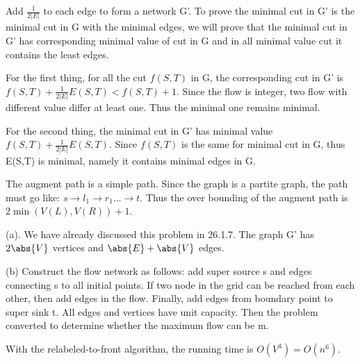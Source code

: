 \begin{cproblem}[26.2.13]
\end{cproblem}
\begin{csolution}
    Add $\frac{1}{2|E|}$ to each edge to form a network G'. To prove the minimal cut in G' is the minimal cut in G with the minimal edges, we will prove that the minimal cut in G' has corresponding minimal value of cut in G and in all minimal value cut it contains the least edges.

    For the first thing, for all the cut $f(S,T)$ in G, the corresponding cut in G' is $f(S,T)+\frac{1}{2|E|}E(S,T)<f(S,T)+1$. Since the flow is integer, two flow with different value differ at least one. Thus the minimal one remains minimal.

    For the second thing, the minimal cut in G' has minimal value $f(S,T)+\frac{1}{2|E|}E(S,T)$. Since $f(S,T)$ is the same for minimal cut in G, thus E(S,T) is minimal, namely it contains minimal edges in G.
\end{csolution}

\begin{cproblem}[26.3.3]
\end{cproblem}
\begin{csolution}
    The augment path is a simple path. Since the graph is a partite graph, the path must go like: $s\rightarrow l_1\rightarrow r_1\dots \rightarrow t$. Thus the over bounding of the augment path is $2\min{(V(L),V(R))}+1$.
\end{csolution}

\begin{cproblem}[26-1]
\end{cproblem}
\begin{csolution}
    (a). We have already discussed this problem in 26.1.7. The graph G' has $2\abs{V}$ vertices and $\abs{E}+\abs{V}$ edges.

    (b) Construct the flow network as follows: add super source s and edges connecting s to all initial points. If two node in the grid can be reached from each other, then add edges in the flow. Finally, add edges from boundary point to super sink t. All edges and vertices have unit capacity. Then the problem converted to determine whether the maximum flow can be m.
    
    With the relabeled-to-front algorithm, the running time is $O(V^3)=O(n^6)$.
\end{csolution}

